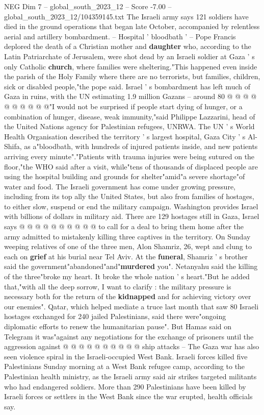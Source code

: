 \begin{textsample}{NEG Dim 7 – global\_south\_2023\_12 – Score -7.00 – global\_south\_2023\_12/104359145.txt}
The Israeli army says 121 soldiers have died in the ground operations that began late October, accompanied by relentless aerial and artillery bombardment. -- Hospital ' bloodbath ' -- Pope Francis deplored the death of a Christian mother and \textbf{daughter} who, according to the Latin Patriarchate of Jerusalem, were shot dead by an Israeli soldier at Gaza ' s only Catholic \textbf{church}, where families were sheltering."This happened even inside the parish of the Holy Family where there are no terrorists, but families, children, sick or disabled people,"the pope said.
Israel ' s bombardment has left much of Gaza in ruins, with the UN estimating 1.9 million Gazans -- around 80 @ @ @ @ @ @ @ @ @ @"I would not be surprised if people start dying of hunger, or a combination of hunger, disease, weak immunity,"said Philippe Lazzarini, head of the United Nations agency for Palestinian refugees, UNRWA.
The UN ' s World Health Organisation described the territory ' s largest hospital, Gaza City ' s Al-Shifa, as a"bloodbath, with hundreds of injured patients inside, and new patients arriving every minute"."Patients with trauma injuries were being sutured on the floor,"the WHO said after a visit, while"tens of thousands of displaced people are using the hospital building and grounds for shelter"amid"a severe shortage"of water and food.
The Israeli government has come under growing pressure, including from its top ally the United States, but also from families of hostages, to either slow, suspend or end the military campaign.
Washington provides Israel with billions of dollars in military aid.
There are 129 hostages still in Gaza, Israel says @ @ @ @ @ @ @ @ @ @ to call for a deal to bring them home after the army admitted to mistakenly killing three captives in the territory.
On Sunday weeping relatives of one of the three men, Alon Shamriz, 26, wept and clung to each on \textbf{grief} at his burial near Tel Aviv.
At the \textbf{funeral}, Shamriz ' s brother said the government"abandoned"and"\textbf{murdered} you".
Netanyahu said the killing of the three"broke my heart.
It broke the whole nation ' s heart."But he added that,"with all the deep sorrow, I want to clarify : the military pressure is necessary both for the return of the \textbf{kidnapped} and for achieving victory over our enemies".
Qatar, which helped mediate a truce last month that saw 80 Israeli hostages exchanged for 240 jailed Palestinians, said there were"ongoing diplomatic efforts to renew the humanitarian pause".
But Hamas said on Telegram it was"against any negotiations for the exchange of prisoners until the aggression against @ @ @ @ @ @ @ @ @ @ ship attacks -- The Gaza war has also seen violence spiral in the Israeli-occupied West Bank.
Israeli forces killed five Palestinians Sunday morning at a West Bank refugee camp, according to the Palestinian health ministry, as the Israeli army said air strikes targeted militants who had endangered soldiers.
More than 290 Palestinians have been killed by Israeli forces or settlers in the West Bank since the war erupted, health officials say.

\end{textsample}
